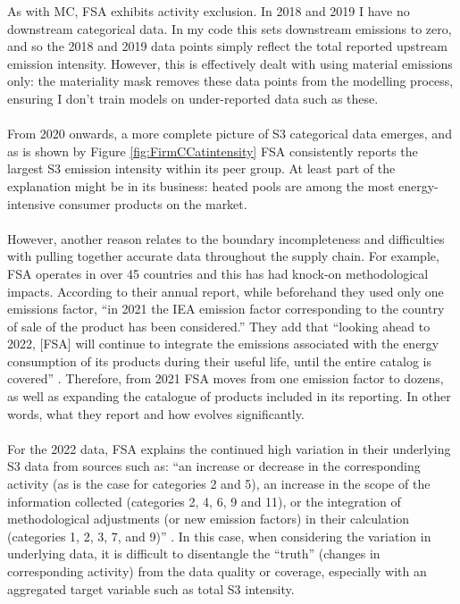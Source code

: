 \documentclass[12pt,twoside]{report}
\begin{document}
As with MC, FSA exhibits activity exclusion. In 2018 and 2019 I have no downstream categorical data. In my code this sets downstream emissions to zero, and so the 2018 and 2019 data points simply reflect the total reported upstream emission intensity. However, this is effectively dealt with using material emissions only: the materiality mask removes these data points from the modelling process, ensuring I don't train models on under-reported data such as these. 
\\\\
From 2020 onwards, a more complete picture of S3 categorical data emerges, and as is shown by Figure \ref{fig:FirmCCatintensity} FSA consistently reports the largest S3 emission intensity within its peer group. At least part of the explanation might be in its business: heated pools are among the most energy-intensive consumer products on the market.  
\\\\
However, another reason relates to the boundary incompleteness and difficulties with pulling together accurate data throughout the supply chain. For example, FSA operates in over 45 countries and this has had knock-on methodological impacts. According to their annual report, while beforehand they used only one emissions factor, ``in 2021  the IEA emission factor corresponding to the country of sale of the product has been considered.'' They add that  ``looking  ahead to 2022, [FSA] will continue to integrate the emissions associated with the energy consumption of its products during their useful life, until the entire catalog is covered'' \cite{Fluidra2022}. Therefore, from 2021 FSA moves from one emission factor to dozens, as well as expanding the catalogue of products included in its reporting. In other words, what they report and how evolves significantly.  
\\\\
For the 2022 data, FSA explains the continued high variation in their underlying S3 data from sources such as: ``an increase or decrease in the corresponding activity (as is the case for categories 2 and 5), an increase in the scope of the information collected (categories 2, 4, 6, 9 and 11), or the integration of methodological adjustments (or new emission factors) in their calculation (categories 1, 2, 3, 7, and 9)'' \cite{Fluidra2023}. In this case, when considering the variation in underlying data, it is difficult to disentangle the ``truth'' (changes in corresponding activity) from the data quality or coverage, especially with an aggregated target variable such as total S3 intensity.  
\end{document}
